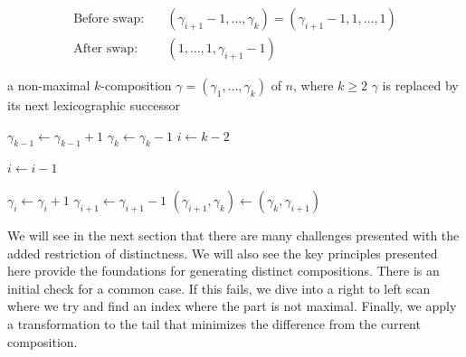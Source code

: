 \[
    \begin{aligned}
        \text{Before swap:} \quad & (\gamma_{i + 1} - 1, \dots, \gamma_k) = (\gamma_{i + 1} - 1, 1, \dots, 1) \\
        \text{After swap:} \quad & (1, \dots, 1, \gamma_{i + 1} - 1)
    \end{aligned}
\]

\begin{algorithm}
    \caption{Next Lexicographic $k$-Composition of $n$}
    \label{alg:next-k-composition}

    \begin{algorithmic}[1] %

            \Input a non-maximal $k$-composition $\gamma = (\gamma_1, \dots, \gamma_k)$ of $n$, where $k \geq 2$
            \Postcondition $\gamma$ is replaced by its next lexicographic successor

                \State $\gamma_{k - 1} \gets \gamma_{k - 1} + 1$
                \State $\gamma_k \gets \gamma_k - 1$
            \Else
                \State $i \gets k - 2$

                    \State $i \gets i - 1$
                \EndWhile

                \State $\gamma_i \gets \gamma_i + 1$
                \State $\gamma_{i + 1} \gets \gamma_{i + 1} - 1$
                \State $(\gamma_{i + 1}, \gamma_k) \gets (\gamma_k, \gamma_{i + 1})$
            \EndIf

        \EndProcedure
    \end{algorithmic}
\end{algorithm}

We will see in the next section that there are many challenges presented with the added restriction of distinctness. We will also see the key principles presented here provide the foundations for generating distinct compositions. There is an initial check for a common case. If this fails, we dive into a right to left scan where we try and find an index where the part is not maximal. Finally, we apply a transformation to the tail that minimizes the difference from the current composition.
